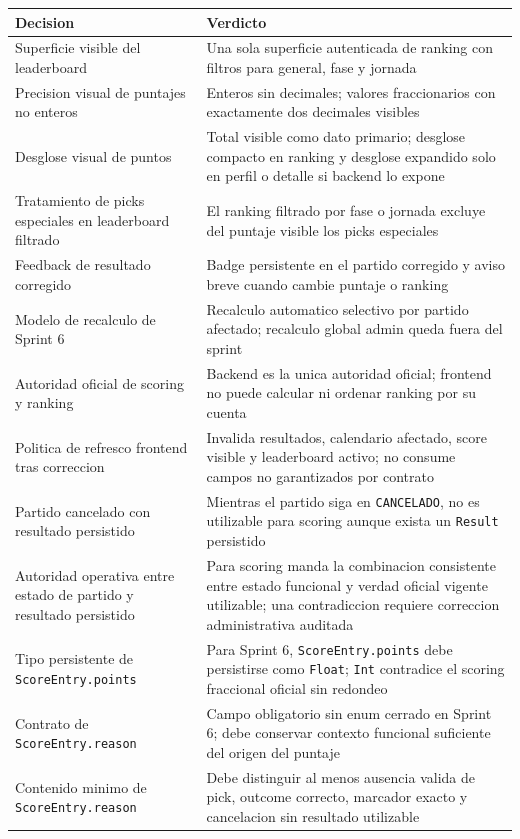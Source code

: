 \begin{longtable}{p{}p{}}
\toprule
\textbf{Decision} & \textbf{Verdicto} \\
\midrule
Superficie visible del leaderboard & Una sola superficie autenticada de ranking con filtros para general, fase y jornada \\
Precision visual de puntajes no enteros & Enteros sin decimales; valores fraccionarios con exactamente dos decimales visibles \\
Desglose visual de puntos & Total visible como dato primario; desglose compacto en ranking y desglose expandido solo en perfil o detalle si backend lo expone \\
Tratamiento de picks especiales en leaderboard filtrado & El ranking filtrado por fase o jornada excluye del puntaje visible los picks especiales \\
Feedback de resultado corregido & Badge persistente en el partido corregido y aviso breve cuando cambie puntaje o ranking \\
Modelo de recalculo de Sprint 6 & Recalculo automatico selectivo por partido afectado; recalculo global admin queda fuera del sprint \\
Autoridad oficial de scoring y ranking & Backend es la unica autoridad oficial; frontend no puede calcular ni ordenar ranking por su cuenta \\
Politica de refresco frontend tras correccion & Invalida resultados, calendario afectado, score visible y leaderboard activo; no consume campos no garantizados por contrato \\
Partido cancelado con resultado persistido & Mientras el partido siga en \texttt{CANCELADO}, no es utilizable para scoring aunque exista un \texttt{Result} persistido \\
Autoridad operativa entre estado de partido y resultado persistido & Para scoring manda la combinacion consistente entre estado funcional y verdad oficial vigente utilizable; una contradiccion requiere correccion administrativa auditada \\
Tipo persistente de \texttt{ScoreEntry.points} & Para Sprint 6, \texttt{ScoreEntry.points} debe persistirse como \texttt{Float}; \texttt{Int} contradice el scoring fraccional oficial sin redondeo \\
Contrato de \texttt{ScoreEntry.reason} & Campo obligatorio sin enum cerrado en Sprint 6; debe conservar contexto funcional suficiente del origen del puntaje \\
Contenido minimo de \texttt{ScoreEntry.reason} & Debe distinguir al menos ausencia valida de pick, outcome correcto, marcador exacto y cancelacion sin resultado utilizable \\

\end{longtable}

